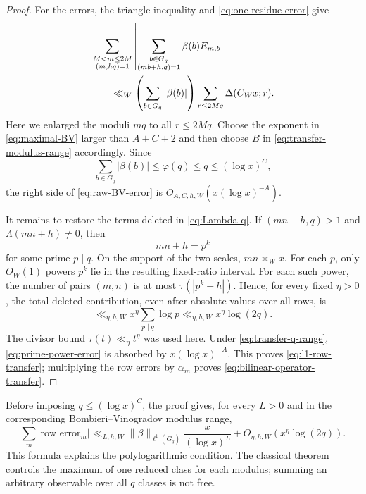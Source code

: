 \begin{proof}
For the errors, the triangle inequality and \eqref{eq:one-residue-error}
give
\begin{align}
 &\sum_{\substack{M<m\leq2M\\(m,hq)=1}}
  \left|
   \sum_{\substack{b\in G_q\\(mb+h,q)=1}}\beta(b)E_{m,b}
  \right|
 \notag\\
 &\qquad\ll_W
 \left(\sum_{b\in G_q}|\beta(b)|\right)
 \sum_{r\leq2Mq}\Delta(C_Wx;r).
 \label{eq:raw-BV-error}
\end{align}
Here we enlarged the moduli $mq$ to all $r\leq2Mq$.  Choose the exponent in
\eqref{eq:maximal-BV} larger than $A+C+2$ and then choose $B$ in
\eqref{eq:transfer-modulus-range} accordingly.  Since
\begin{equation}\label{eq:l1-beta-cost}
 \sum_{b\in G_q}|\beta(b)|\leq\varphi(q)\leq q\leq(\log x)^C,
\end{equation}
the right side of \eqref{eq:raw-BV-error} is
$O_{A,C,h,W}(x(\log x)^{-A})$.

It remains to restore the terms deleted in \eqref{eq:Lambda-q}.  If
$(mn+h,q)>1$ and $\Lambda(mn+h)\ne0$, then
\begin{equation}\label{eq:exceptional-prime-power}
 mn+h=p^k
\end{equation}
for some prime $p\mid q$.  On the support of the two scales, $mn\asymp_W x$.
For each $p$, only $O_W(1)$ powers $p^k$ lie in the resulting fixed-ratio
interval.  For each such power, the number of pairs $(m,n)$ is at most
$\tau(|p^k-h|)$.  Hence, for every fixed $\eta>0$, the total deleted
contribution, even after absolute values over all rows, is
\begin{equation}\label{eq:prime-power-error}
 \ll_{\eta,h,W}x^\eta\sum_{p\mid q}\log p
 \ll_{\eta,h,W}x^\eta\log(2q).
\end{equation}
The divisor bound $\tau(t)\ll_\eta t^\eta$ was used here.  Under
\eqref{eq:transfer-q-range}, \eqref{eq:prime-power-error} is absorbed by
$x(\log x)^{-A}$.  This proves \eqref{eq:l1-row-transfer}; multiplying the
row errors by $\alpha_m$ proves \eqref{eq:bilinear-operator-transfer}.
\end{proof}

\begin{remark}
\label{rem:raw-complexity-bound}
Before imposing $q\leq(\log x)^C$, the proof gives, for every $L>0$ and in
the corresponding Bombieri--Vinogradov modulus range,
\begin{equation}\label{eq:raw-complexity-bound}
 \sum_m|\text{row error}_m|
 \ll_{L,h,W}
 \|\beta\|_{\ell^1(G_q)}\frac{x}{(\log x)^L}
 +O_{\eta,h,W}(x^\eta\log(2q)).
\end{equation}
This formula explains the polylogarithmic condition.  The classical theorem
controls the maximum of one reduced class for each modulus; summing an
arbitrary observable over all $q$ classes is not free.
\end{remark}

